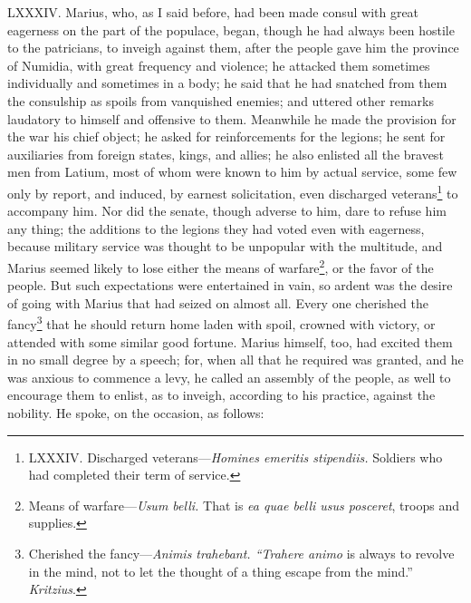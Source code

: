 LXXXIV. Marius, who, as I said before, had been made consul with great
eagerness on the part of the populace, began, though he had always
been hostile to the patricians, to inveigh against them, after the
people gave him the province of Numidia, with great frequency and
violence; he attacked them sometimes individually and sometimes in a
body; he said that he had snatched from them the consulship as spoils
from vanquished enemies; and uttered other remarks laudatory to
himself and offensive to them. Meanwhile he made the provision for the
war his chief object; he asked for reinforcements for the legions; he
sent for auxiliaries from foreign states, kings, and allies; he also
enlisted all the bravest men from Latium, most of whom were known to
him by actual service, some few only by report, and induced, by
earnest solicitation, even discharged veterans\footnote{LXXXIV. Discharged veterans—\emph{Homines emeritis stipendiis.}
Soldiers who had completed their term of service.} to accompany him.
Nor did the senate, though adverse to him, dare to refuse him any
thing; the additions to the legions they had voted even with
eagerness, because military service was thought to be unpopular with
the multitude, and Marius seemed likely to lose either the means of
warfare\footnote{Means of warfare—\emph{Usum belli.} That is \emph{ea quae belli usus
posceret}, troops and supplies.}, or the favor of the people. But such expectations were
entertained in vain, so ardent was the desire of going with Marius
that had seized on almost all. Every one cherished the fancy\footnote{Cherished the fancy—\emph{Animis trahebant. ``Trahere animo} is
always to revolve in the mind, not to let the thought of a thing
escape from the mind.'' \emph{Kritzius}.} that
he should return home laden with spoil, crowned with victory, or
attended with some similar good fortune. Marius himself, too, had
excited them in no small degree by a speech; for, when all that he
required was granted, and he was anxious to commence a levy, he called
an assembly of the people, as well to encourage them to enlist, as to
inveigh, according to his practice, against the nobility. He spoke, on
the occasion, as follows:

